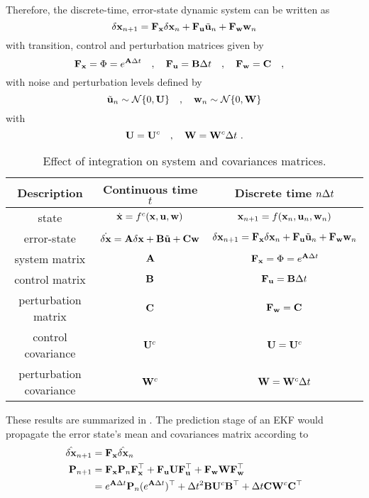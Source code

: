 %
Therefore, the discrete-time, error-state dynamic system can be written as
%
\begin{equation}
\delta{\bf x}_{n+1} = {\bf F}_{\bf x}\delta{\bf x}_n + {\bf F}_{\bf u}\tilde{{\bf u}}_n + {\bf F}_{\bf w} {\bf w}_n \label{equ:discTime}
\end{equation}
%
with  transition, control and perturbation matrices given by
%
\begin{equation}
{\bf F}_{\bf x}=\Phi = e^{{\bf A}\Delta t} \quad , \quad {\bf F}_{\bf u}={\bf B}\Delta t \quad , \quad {\bf F}_{\bf w} = {\bf C} \quad , \quad 
\end{equation}
%
with noise and perturbation levels defined by
%
\begin{equation}
\tilde{{\bf u}}_n\sim\mathcal{N}\{0,{\bf U}\} \quad , \quad {\bf w}_n\sim\mathcal{N}\{0,{\bf W}\} \label{equ:discMat}
\end{equation}
%
with 
%
\begin{equation}
{\bf U} = {\bf U}^c \quad , \quad {\bf W} = {\bf W}^c\Delta t~. \label{equ:discCov}
\end{equation}
%
\begin{table*}
\renewcommand{\arraystretch}{1.3}
\caption{Effect of integration on system and covariances matrices.}
\centering
\vspace{1ex}
\begin{tabular}{|c|c|c|}
\hline
Description & Continuous time $t$ & Discrete time $n\Delta t$\\
\hline
\hline
state & $\dot{{\bf x}}=f^c({\bf x},{\bf u},{\bf w})$ & ${\bf x}_{n+1} = f({\bf x}_n,{\bf u}_n,{\bf w}_n)$ \\
error-state & $\dot{\delta{\bf x}}={\bf A}\delta{\bf x}+{\bf B}\tilde{{\bf u}}+{\bf C}{\bf w}$ & $\delta{\bf x}_{n+1}={\bf F}_{\bf x}\delta{\bf x}_n+{\bf F}_{\bf u}\tilde{{\bf u}}_n+{\bf F}_{\bf w}{\bf w}_n$ \\
\hline
system matrix & ${\bf A}$ & ${\bf F}_{\bf x}=\Phi=e^{{\bf A}\Delta t}$ \\
control matrix & ${\bf B}$ & ${\bf F}_{\bf u}={\bf B}\Delta t$ \\
perturbation matrix & ${\bf C}$ & ${\bf F}_{\bf w}={\bf C}$ \\
\hline
control covariance & ${\bf U}^c$ & ${\bf U}={\bf U}^c$  \\
perturbation covariance & ${\bf W}^c$ & ${\bf W}={\bf W}^c\Delta t$  \\
\hline
\end{tabular}
\label{tab:IntEffects}
\end{table*}%

These results are summarized in . 
The prediction stage of an EKF would propagate the error state's mean and covariances matrix according to
%
\begin{align}
\hat{\delta{\bf x}}_{n+1} &= {\bf F}_{\bf x} \hat{\delta{\bf x}}_n \\
{\bf P}_{n+1} &= {\bf F}_{\bf x}{\bf P}_n{\bf F}_{\bf x}^{\top} + {\bf F}_{\bf u}{\bf U}{\bf F}_{\bf u}^{\top} + {\bf F}_{\bf w}{\bf W}{\bf F}_{\bf w}^{\top} \nonumber\\
&= e^{{\bf A}\Delta t}{\bf P}_n(e^{{\bf A}\Delta t})^{\top} + \Delta t^2{\bf B}{\bf U}^c{\bf B}^{\top} + \Delta t{\bf C}{\bf W}^c{\bf C}^{\top} \label{equ:NoisePertCovUpdate}
\end{align}

